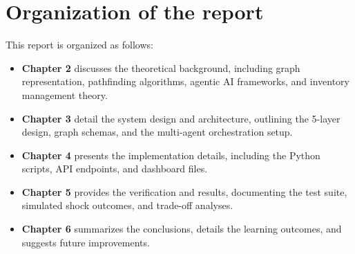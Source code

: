 \section[Organization of the report]{\textbf{Organization of the report}}
This report is organized as follows:
\begin{itemize}
\item \textbf{Chapter 2} discusses the theoretical background, including graph representation, pathfinding algorithms, agentic AI frameworks, and inventory management theory.
\item \textbf{Chapter 3} detail the system design and architecture, outlining the 5-layer design, graph schemas, and the multi-agent orchestration setup.
\item \textbf{Chapter 4} presents the implementation details, including the Python scripts, API endpoints, and dashboard files.
\item \textbf{Chapter 5} provides the verification and results, documenting the test suite, simulated shock outcomes, and trade-off analyses.
\item \textbf{Chapter 6} summarizes the conclusions, details the learning outcomes, and suggests future improvements.
\end{itemize}